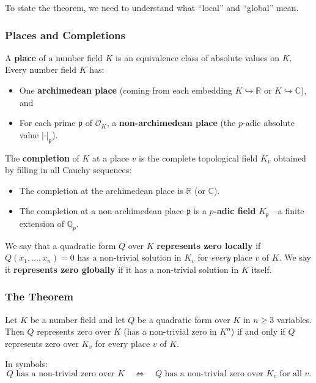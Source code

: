 To state the theorem, we need to understand what ``local'' and ``global'' mean.

\subsubsection{Places and Completions}

A \textbf{place} of a number field $K$ is an equivalence class of absolute values on $K$. Every number field $K$ has:
\begin{itemize}
    \item One \textbf{archimedean place} (coming from each embedding $K \hookrightarrow \mathbb{R}$ or $K \hookrightarrow \mathbb{C}$), and
    \item For each prime $\mathfrak{p}$ of $\mathcal{O}_K$, a \textbf{non-archimedean place} (the $p$-adic absolute value $|\cdot|_\mathfrak{p}$).
\end{itemize}

The \textbf{completion} of $K$ at a place $v$ is the complete topological field $K_v$ obtained by filling in all Cauchy sequences:
\begin{itemize}
    \item The completion at the archimedean place is $\mathbb{R}$ (or $\mathbb{C}$).
    \item The completion at a non-archimedean place $\mathfrak{p}$ is a \textbf{$p$-adic field} $K_\mathfrak{p}$---a finite extension of $\mathbb{Q}_p$.
\end{itemize}

We say that a quadratic form $Q$ over $K$ \textbf{represents zero locally} if $Q(x_1, \ldots, x_n) = 0$ has a non-trivial solution in $K_v$ for \emph{every} place $v$ of $K$. We say it \textbf{represents zero globally} if it has a non-trivial solution in $K$ itself.

\subsubsection{The Theorem}

\begin{theorem}
\label{thm:hasse-minkowski}
Let $K$ be a number field and let $Q$ be a quadratic form over $K$ in $n \ge 3$ variables. Then $Q$ represents zero over $K$ (has a non-trivial zero in $K^n$) if and only if $Q$ represents zero over $K_v$ for every place $v$ of $K$.
\end{theorem}

In symbols:
\[
    Q \text{ has a non-trivial zero over } K
    \quad\Longleftrightarrow\quad
    Q \text{ has a non-trivial zero over } K_v \text{ for all } v.
\]

